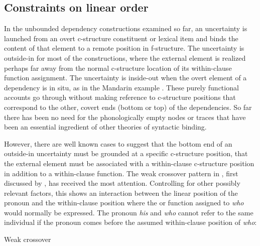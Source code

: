 \documentclass[output=paper,hidelinks]{langscibook}
\begin{document}
\subsection{Constraints on linear order}\label{linearorder}

In the unbounded dependency constructions examined so far, an uncertainty is launched from an overt c-structure constituent or lexical item and binds the content of that element to a remote position in f-structure.  The uncertainty is outside-in for most of the constructions, where the external element is realized perhaps far away from the normal c-structure location of its within-clause function assignment. The uncertainty is inside-out when the overt element of a dependency is in situ, as in the Mandarin example .  These purely functional accounts go through without making reference to c-structure positions that correspond to the other, covert ends (bottom or top) of the dependencies. So far there has been no need for the phonologically empty nodes or traces that have been an essential ingredient of other theories of syntactic binding.

However, there are well known cases to suggest that the bottom end of an outside-in uncertainty must be grounded at a specific c-structure position, that the external element must be associated with a within-clause c-structure position in addition to a within-clause function.   The weak crossover pattern in , first discussed by \citet{Wasow79}, has received the most attention.  Controlling for other possibly relevant factors, this shows an interaction between the linear position of the pronoun and the within-clause position where the \OBJ or \OBLTHETA function assigned to  \textit{who} would normally be expressed.  The pronoun \textit{his}  and \textit{who} cannot refer to the same individual if the pronoun comes before the assumed within-clause position of \textit{who}:

\ea \label{crossover}Weak crossover \hsp{1em}\citep[examples from][]{dalrympleetal2001}
\label{cross1}
\label{cross2}
\label{cross3}
\z\z
\end{document}
